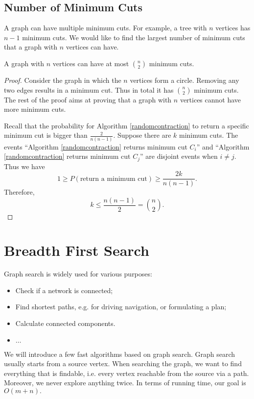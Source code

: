 \subsection{Number of Minimum Cuts}
A graph can have multiple minimum cuts. For example, a tree with $n$ vertices has $n-1$ minimum cuts. We would like to find the largest number of minimum cuts that a graph with $n$ vertices can have.
\begin{theorem}
A graph with $n$ vertices can have at most $\binom{n}{2}$ minimum cuts.
\end{theorem}
\begin{proof}
Consider the graph in which the $n$ vertices form a circle. Removing any two edges results in a minimum cut. Thus in total it has $\binom{n}{2}$ minimum cuts. The rest of the proof aims at proving that a graph with $n$ vertices cannot have more minimum cuts.

Recall that the probability for Algorithm \ref{randomcontraction} to return a specific minimum cut is bigger than $\frac{2}{n(n-1)}$. Suppose there are $k$ minimum cuts. The events ``Algorithm \ref{randomcontraction} returns minimum cut $C_i$'' and  ``Algorithm \ref{randomcontraction} returns minimum cut $C_j$'' are disjoint events when $i\neq j$. Thus we have 
$$1\geq P(\text{return a minimum cut})\geq\frac{2k}{n(n-1)}.$$
Therefore, 
$$k\leq \frac{n(n-1)}{2}=\binom{n}{2}.$$
\end{proof}
\section{Breadth First Search}
Graph search is widely used for various purposes:
\begin{itemize}
\item Check if a network is connected;
\item Find shortest paths, e.g. for driving navigation, or formulating a plan;
\item Calculate connected components.
\item $\dots$
\end{itemize}
We will introduce a few fast algorithms based on graph search. Graph search usually starts from a source vertex. When searching the graph, we want to find everything that is findable, i.e. every vertex reachable from the source via a path. Moreover, we never explore anything twice. In terms of running time, our goal is $O(m+n).$ 
